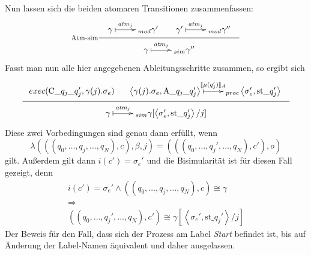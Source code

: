 Nun lassen sich die beiden atomaren Transitionen zusammenfassen:
\[
\inference[Atm-sim]{
  \xymatrix{ \gamma \ar@{|->}[r]^-{\mathit{atm}_j} & _{mod}
    \gamma'
  } &
  \xymatrix{ \gamma'\ar@{|->}[r]^-{\mathit{atm}_j} & _{mod}
    \gamma''
  }
}{
  \xymatrix{ \gamma \ar@{|->}[r]^-{\mathit{atm}_j} & _{sim}
    \gamma''
  }
}
\]
Fasst man nun alle hier angegebenen Ableitungsschritte zusammen, so ergibt sich
\[
\inference{
  exec(\textrm{C\_}q_j\textrm{\_}q_j',\gamma(j).\sigma_e) &
  \xymatrix{ \left<\gamma(j).\sigma_e,\textrm{A\_}q_j\textrm{\_}q_j'\right> \ar@{|->}[r]^-{\llbracket \mu(q_j')\rrbracket_A} & _{proc}
    \left<\sigma_e',\textrm{st\_}q_j'\right> }
}{
  \xymatrix{ \gamma \ar@{|->}[r]^-{\mathit{atm}_j} & _{sim}
    \gamma[\left<\sigma_e',\textrm{st\_}q_j'\right>/j]
  }
}
\]
Diese zwei Vorbedingungen sind genau dann erfüllt, wenn
\[ \lambda(((q_0,\dots,q_j,\dots,q_N),c),\beta,j) = (((q_0,\dots,q_j',\dots,q_N),c'),o) \]
gilt.
Außerdem gilt dann $i(c') = \sigma_e'$ und die Bisimularität ist für diesen Fall gezeigt, denn
\[
\begin{array}{c}
  i(c') = \sigma_e' \land ((q_0,\dots,q_j,\dots,q_N),c)\cong\gamma\\
  \Rightarrow\\
  ((q_0,\dots,q_j',\dots,q_N),c')\cong \gamma[\left<\sigma_e',\textrm{st\_}q_j'\right>/j]
\end{array}
\]
Der Beweis für den Fall, dass sich der Prozess am Label \emph{Start} befindet ist, bis auf Änderung der Label-Namen äquivalent und daher ausgelassen.
